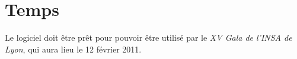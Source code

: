 \section{Temps}
Le logiciel doit être prêt pour pouvoir être utilisé par le \emph{XV\ieme{} Gala de l'INSA de Lyon}, qui aura lieu le 12 février 2011.